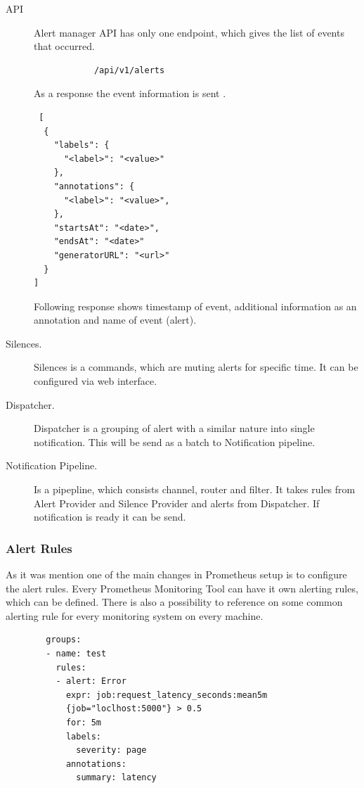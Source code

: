 \begin{description}
\item[API] Alert manager API has only one endpoint, which gives the list of events that occurred.
\begin{lstlisting}
            /api/v1/alerts
\end{lstlisting}

As a response the event information is sent \cite{alert_send}.
 \begin{lstlisting}
 [
  {
    "labels": {
      "<label>": "<value>"
    },
    "annotations": {
      "<label>": "<value>",
    },
    "startsAt": "<date>",
    "endsAt": "<date>"
    "generatorURL": "<url>"
  }
]
\end{lstlisting}
Following response shows timestamp of event, additional information as an annotation and name of event (alert). 
\item[Silences.] Silences is a commands, which are muting alerts for specific time. It can be configured via web interface. 
\item[Dispatcher.] Dispatcher is a grouping of alert with a similar nature into single notification. This will be send as a batch to Notification pipeline.
\item[Notification Pipeline.] Is a pipepline, which consists channel, router and filter. It takes rules from Alert Provider and Silence Provider and alerts from Dispatcher. If notification is ready it can be send. 
\end{description}


\subsubsection{Alert Rules}\label{Alert Rules}

As it was mention one of the main changes in Prometheus setup is to configure the alert rules. Every Prometheus Monitoring Tool can have it own alerting rules, which can be defined. There is also a possibility to reference on some common alerting rule for every monitoring system on every machine. 

 \begin{lstlisting}
        groups:
        - name: test
          rules:
          - alert: Error
            expr: job:request_latency_seconds:mean5m
            {job="loclhost:5000"} > 0.5
            for: 5m
            labels:
              severity: page
            annotations:
              summary: latency
\end{lstlisting}

